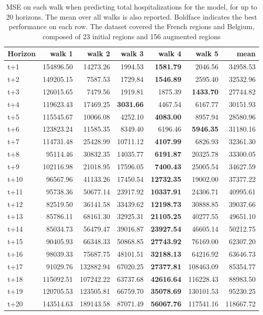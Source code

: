 \begin{table}[H]
\centering
\caption{MSE on each walk when predicting total hospitalizations for the model, for up to 20 horizons. The mean over all walks is also reported. Boldface indicates the best performance on each row. The dataset covered the French regions and Belgium, composed of 23 initial regions and 156 augmented regions }
\label{tab:MSE_walk_dense_model}
\begin{tabular}{lrrrrrr}
\toprule
Horizon &    walk 1 &    walk 2 &   walk 3 &   walk 4 &    walk 5 &      mean \\
\midrule
t+1  & 154896.50  & 14273.26  & 1994.53  & \textbf{1581.79}  & 2046.56  & 34958.53  \\
t+2  & 149205.15  & 7587.53  & 1729.84  & \textbf{1546.89}  & 2595.40  & 32532.96  \\
t+3  & 126015.65  & 7479.56  & 1919.81  & 1875.39  & \textbf{1433.70}  & 27744.82  \\
t+4  & 119623.43  & 17469.25  & \textbf{3031.66}  & 4467.54  & 6167.77  & 30151.93  \\
t+5  & 115545.67  & 10066.08  & 4252.10  & \textbf{4083.00}  & 8957.94  & 28580.96  \\
t+6  & 123823.24  & 11585.35  & 8349.40  & 6196.46  & \textbf{5946.35}  & 31180.16  \\
t+7  & 114731.48  & 25428.99  & 10711.12  & \textbf{4107.99}  & 6826.93  & 32361.30  \\
t+8  & 95114.46  & 30832.35  & 14035.77  & \textbf{6191.87}  & 20325.78  & 33300.05  \\
t+9  & 102116.98  & 21018.95  & 17596.05  & \textbf{7400.43}  & 25005.54  & 34627.59  \\
t+10  & 96567.96  & 41133.26  & 17450.54  & \textbf{12732.35}  & 19002.00  & 37377.22  \\
t+11  & 95738.36  & 50677.14  & 23917.92  & \textbf{10337.91}  & 24306.71  & 40995.61  \\
t+12  & 82519.50  & 36141.58  & 33439.62  & \textbf{12198.73}  & 30888.85  & 39037.66  \\
t+13  & 85786.11  & 68161.30  & 32925.31  & \textbf{21105.25}  & 40277.55  & 49651.10  \\
t+14  & 85034.73  & 56479.47  & 39016.87  & \textbf{23927.54}  & 46605.14  & 50212.75  \\
t+15  & 90405.93  & 66348.33  & 50868.85  & \textbf{27743.92}  & 76169.00  & 62307.20  \\
t+16  & 98039.33  & 75687.75  & 48101.51  & \textbf{32188.13}  & 64216.92  & 63646.73  \\
t+17  & 91029.76  & 132882.94  & 67020.25  & \textbf{27377.81}  & 108463.09  & 85354.77  \\
t+18  & 115092.51  & 107242.22  & 63737.68  & \textbf{42616.64}  & 116228.43  & 88983.50  \\
t+19  & 120705.53  & 123505.81  & 66759.70  & \textbf{35078.69}  & 130101.53  & 95230.25  \\
t+20  & 143514.63  & 189143.58  & 87071.49  & \textbf{56067.76}  & 117541.16  & 118667.72  \\

\bottomrule
\end{tabular}
\end{table}
